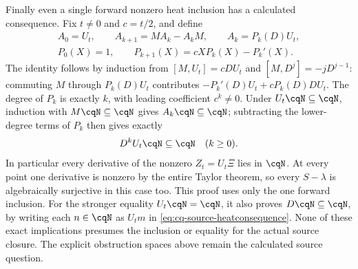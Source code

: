 Finally even a single forward nonzero heat inclusion has a calculated
consequence. Fix $t\ne0$ and $c=t/2$, and define
\begin{equation}\label{eq:cq-source-heatcommutator}
 \begin{gathered}
 A_0=U_t,\qquad A_{k+1}=MA_k-A_kM,\qquad A_k=P_k(D)U_t,\\
 P_0(X)=1,\qquad P_{k+1}(X)=cX P_k(X)-P_k'(X).
 \end{gathered}
\end{equation}
The identity follows by induction from $[M,U_t]=cDU_t$ and
$[M,D^j]=-jD^{j-1}$: commuting $M$ through $P_k(D)U_t$
contributes $-P_k'(D)U_t+cP_k(D)DU_t$.
The degree of $P_k$ is exactly $k$, with leading coefficient
$c^k\ne0$. Under $U_t\cqN\subseteq\cqN$, induction with
$M\cqN\subseteq\cqN$ gives $A_k\cqN\subseteq\cqN$;
subtracting the lower-degree terms of $P_k$ then gives exactly
\begin{equation}\label{eq:cq-source-heatconsequence}
 D^kU_t\cqN\subseteq\cqN\quad(k\geq0).
\end{equation}
In particular every derivative of the nonzero $Z_t=U_t\Xi$ lies
in $\cqN$. At every point one derivative is nonzero by the entire
Taylor theorem, so every $S-\lambda$ is algebraically surjective
in this case too. This proof uses only the one forward inclusion.
For the stronger equality $U_t\cqN=\cqN$, it also proves
$D\cqN\subseteq\cqN$, by writing each $n\in\cqN$ as
$U_tm$ in \eqref{eq:cq-source-heatconsequence}. None of these
exact implications presumes the inclusion or equality for the actual
source closure. The explicit obstruction spaces above remain the
calculated source question.
